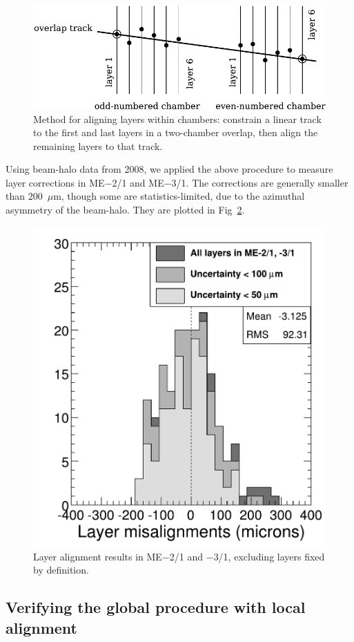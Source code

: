 \documentclass[12pt]{article}
\begin{document}
\begin{figure}
\begin{center}
\includegraphics[width=0.75\linewidth]{layer_alignment_noskew.pdf}
\end{center}
\caption{Method for aligning layers within chambers: constrain a linear track to the first and last layers in a two-chamber overlap, then align the remaining layers to that track. \label{fig:layer_alignment_noskew}}
\end{figure}

Using beam-halo data from 2008, we applied the above procedure to
measure layer corrections in ME$-$2/1 and ME$-$3/1.  The corrections
are generally smaller than 200~$\mu$m, though some are
statistics-limited, due to the azimuthal asymmetry of the beam-halo.
They are plotted in Fig~\ref{fig:layer_hist}.

\begin{figure}
\begin{center}
\includegraphics[width=0.5\linewidth]{layer_hist.pdf}
\end{center}
\caption{Layer alignment results in ME$-$2/1 and $-$3/1, excluding layers fixed by definition. \label{fig:layer_hist}}
\end{figure}

\subsection{Verifying the global procedure with local alignment}
\end{document}

